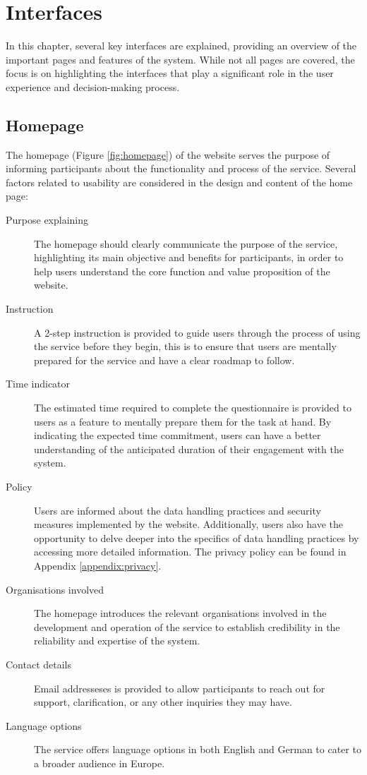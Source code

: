 \section{Interfaces}

In this chapter, several key interfaces are explained, providing an overview of the important pages and features of the system. 
While not all pages are covered, the focus is on highlighting the interfaces that play a significant role in the user experience and decision-making process. 


\subsection*{Homepage}

The homepage (Figure \ref{fig:homepage}) of the website serves the purpose of informing participants about the functionality and process of the service. 
Several factors related to usability are considered in the design and content of the home page:
\begin{description}
  \item[Purpose explaining] The homepage should clearly communicate the purpose of the service, highlighting its main objective and benefits for participants, in order to help users understand the core function and value proposition of the website.
  \item[Instruction] A 2-step instruction is provided to guide users through the process of using the service before they begin, this is to ensure that users are mentally prepared for the service and have a clear roadmap to follow. 
  \item[Time indicator] The estimated time required to complete the questionnaire is provided to users as a feature to mentally prepare them for the task at hand. By indicating the expected time commitment, users can have a better understanding of the anticipated duration of their engagement with the system. 
  \item[Policy] Users are informed about the data handling practices and security measures implemented by the website. Additionally, users also have the opportunity to delve deeper into the specifics of data handling practices by accessing more detailed information. The privacy policy can be found in Appendix \ref{appendix:privacy}. 
  \item[Organisations involved] The homepage introduces the relevant organisations involved in the development and operation of the service to establish credibility in the reliability and expertise of the system.
  \item[Contact details] Email addresseses is provided to allow participants to reach out for support, clarification, or any other inquiries they may have.
  \item[Language options] The service offers language options in both English and German to cater to a broader audience in Europe.
\end{description}

